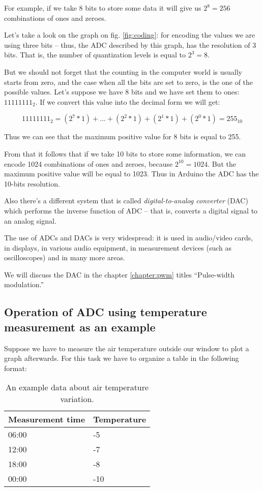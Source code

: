 \documentclass[../sparc.tex]{subfiles}
\begin{document}
For example, if we take 8 bits to store some data it will give us $2^8 = 256$
combinations of ones and zeroes.

Let's take a look on the graph on fig. \ref{fig:coding}: for encoding the values
we are using three bits -- thus, the ADC described by this graph, has the
resolution of 3 bits.  That is, the number of quantization levels is equal to
$2^3 = 8$.

But we should not forget that the counting in the computer world is usually
starts from zero, and the case when all the bits are set to zero, is the one of
the possible values.  Let's suppose we have 8 bits and we have set them to ones:
$11111111_2$.  If we convert this value into the decimal form we will get:

\begin{equation}
  11111111_2 = (2^7 * 1) + \mbox{...} + (2^2 * 1) + (2^1 * 1) + (2^0 * 1) = 255_{10}
\end{equation}

Thus we can see that the maximum positive value for 8 bits is equal to 255.

From that it follows that if we take 10 bits to store some information, we can
encode 1024 combinations of ones and zeroes, because $2^{10} = 1024$.  But the
maximum positive value will be equal to 1023.  Thus in Arduino the ADC has the
10-bits resolution.

Also there's a different system that is called \emph{digital-to-analog
converter} (DAC) which performs the inverse function of ADC -- that is, converts
a digital signal to an analog signal.

The use of ADCs and DACs is very widespread: it is used in audio/video cards, in
displays, in various audio equipment, in measurement devices (such as
oscilloscopes) and in many more areas.

We will discuss the DAC in the chapter \ref{chapter:pwm} titles ``Pulse-width
modulation.''

\subsection{Operation of ADC using temperature measurement as an example}
\label{subsection:adc-temperature-example}

Suppose we have to measure the air temperature outside our window to plot a
graph afterwards.  For this task we have to organize a table in the following
format:

\begin{table}[h]
  \centering
  \begin{tabular}{p{3cm}|p{4cm}}
    Measurement time & Temperature \\
    \hline \hline
    06:00 & -5 \\
    \hline
    12:00 & -7 \\
    \hline
    18:00 & -8 \\
    \hline
    00:00 & -10 \\
    \hline
  \end{tabular}
  \caption{An example data about air temperature variation.}
  \label{table:adc-temperature-data-example-1}
\end{table}
\end{document}
